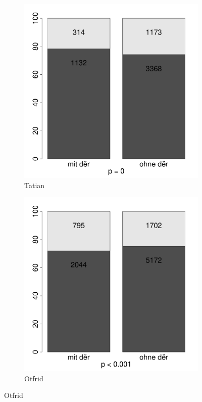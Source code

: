 \begin{figure}
\begin{subfigure}[b]{.5\linewidth}
  \includegraphics[height=.25\textheight]{generated/images/numerus-tatian}
\caption {Tatian}
\end{subfigure}%
\begin{subfigure}[b]{.5\linewidth}
  \includegraphics[height=.25\textheight]{generated/images/numerus-otfrid}
\caption {Otfrid}
\end{subfigure}


\end{figure}
